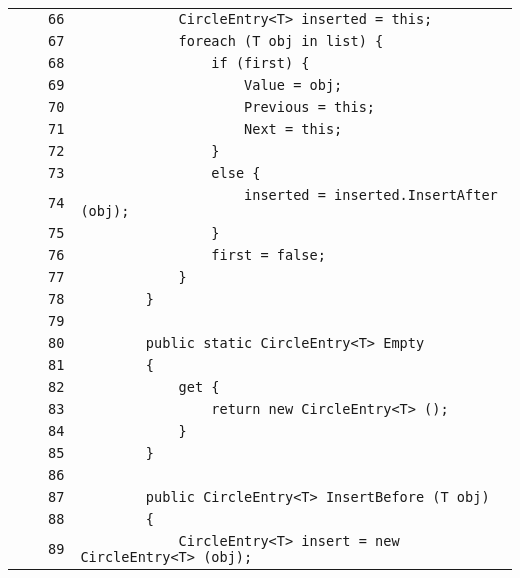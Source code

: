 \documentclass[a4paper,10pt]{article}
\begin{document}
\begin{longtable}[l]{lrrl}
\cellcolor{gray} &  & \verb~66~ & \verb~            CircleEntry<T> inserted = this;~\\
\cellcolor{gray} &  & \verb~67~ & \verb~            foreach (T obj in list) {~\\
\cellcolor{gray} &  & \verb~68~ & \verb~                if (first) {~\\
\cellcolor{gray} &  & \verb~69~ & \verb~                    Value = obj;~\\
\cellcolor{gray} &  & \verb~70~ & \verb~                    Previous = this;~\\
\cellcolor{gray} &  & \verb~71~ & \verb~                    Next = this;~\\
\cellcolor{gray} &  & \verb~72~ & \verb~                }~\\
\cellcolor{gray} &  & \verb~73~ & \verb~                else {~\\
\cellcolor{gray} &  & \verb~74~ & \verb~                    inserted = inserted.InsertAfter (obj);~\\
\cellcolor{gray} &  & \verb~75~ & \verb~                }~\\
\cellcolor{gray} &  & \verb~76~ & \verb~                first = false;~\\
\cellcolor{gray} &  & \verb~77~ & \verb~            }~\\
\cellcolor{gray} &  & \verb~78~ & \verb~        }~\\
\cellcolor{gray} &  & \verb~79~ & \verb~~\\
\cellcolor{gray} &  & \verb~80~ & \verb~        public static CircleEntry<T> Empty~\\
\cellcolor{gray} &  & \verb~81~ & \verb~        {~\\
\cellcolor{gray} &  & \verb~82~ & \verb~            get {~\\
\cellcolor{gray} &  & \verb~83~ & \verb~                return new CircleEntry<T> ();~\\
\cellcolor{gray} &  & \verb~84~ & \verb~            }~\\
\cellcolor{gray} &  & \verb~85~ & \verb~        }~\\
\cellcolor{gray} &  & \verb~86~ & \verb~~\\
\cellcolor{gray} &  & \verb~87~ & \verb~        public CircleEntry<T> InsertBefore (T obj)~\\
\cellcolor{gray} &  & \verb~88~ & \verb~        {~\\
\cellcolor{gray} &  & \verb~89~ & \verb~            CircleEntry<T> insert = new CircleEntry<T> (obj);~\\

\end{longtable}
\end{document}
